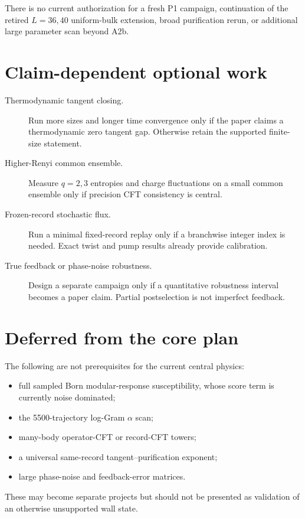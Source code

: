 \documentclass[aps,prx,twocolumn,floatfix,nofootinbib,superscriptaddress]{revtex4-2}
\begin{document}
There is no current authorization for a fresh P1 campaign, continuation of the
retired $L=36,40$ uniform-bulk extension, broad purification rerun, or
additional large parameter scan beyond A2b.

\section{Claim-dependent optional work}

\begin{description}
\item[Thermodynamic tangent closing.]
Run more sizes and longer time convergence only if the paper claims a
thermodynamic zero tangent gap.  Otherwise retain the supported finite-size
statement.

\item[Higher-Renyi common ensemble.]
Measure $q=2,3$ entropies and charge fluctuations on a small common ensemble
only if precision CFT consistency is central.

\item[Frozen-record stochastic flux.]
Run a minimal fixed-record replay only if a branchwise integer index is needed.
Exact twist and pump results already provide calibration.

\item[True feedback or phase-noise robustness.]
Design a separate campaign only if a quantitative robustness interval becomes
a paper claim.  Partial postselection is not imperfect feedback.
\end{description}

\section{Deferred from the core plan}

The following are not prerequisites for the current central physics:
\begin{itemize}
\item full sampled Born modular-response susceptibility, whose score term is
currently noise dominated;
\item the 5500-trajectory log-Gram $\alpha$ scan;
\item many-body operator-CFT or record-CFT towers;
\item a universal same-record tangent--purification exponent;
\item large phase-noise and feedback-error matrices.
\end{itemize}
These may become separate projects but should not be presented as validation of
an otherwise unsupported wall state.
\end{document}
